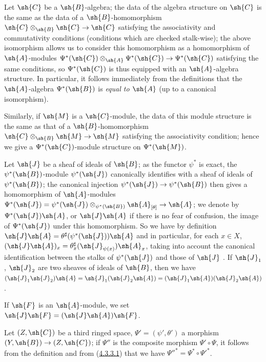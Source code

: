 \begin{env}[4.3.4]
\label{0.4.3.4}
Let $\sh{C}$ be a $\sh{B}$-algebra; the data of the algebra structure on
$\sh{C}$ is the same as the data of a $\sh{B}$-homomorphism
$\sh{C}\otimes_\sh{B}\sh{C}\to\sh{C}$ satisfying the associativity and
commutativity conditions (conditions which are checked stalk-wise); the above
isomorphism allows us to consider this homomorphism as a homomorphism of
$\sh{A}$-modules $\Psi^*(\sh{C})\otimes_\sh{A}\Psi^*(\sh{C})\to\Psi^*(\sh{C})$
satisfying the same conditions, so $\Psi^*(\sh{C})$ is thus equipped with an
$\sh{A}$-algebra structure. In particular, it follows immediately from the
definitions that the $\sh{A}$-algebra $\Psi^*(\sh{B})$ is \emph{equal to
$\sh{A}$} (up to a canonical isomorphism).

Similarly, if $\sh{M}$ is a $\sh{C}$-module, the data of this module structure
is the same
as that of a $\sh{B}$-homomorphism $\sh{C}\otimes_\sh{B}\sh{M}\to\sh{M}$
satisfying the associativity condition; hence we give a $\Psi^*(\sh{C})$-module
structure on $\Psi^*(\sh{M})$.
\end{env}

\begin{env}[4.3.5]
\label{0.4.3.5}
Let $\sh{J}$ be a sheaf of ideals of $\sh{B}$; as the functor $\psi^*$ is exact,
the $\psi^*(\sh{B})$-module $\psi^*(\sh{J})$ canonically identifies with a sheaf
of ideals of $\psi^*(\sh{B})$; the canonical injection
$\psi^*(\sh{J})\to\psi^*(\sh{B})$ then gives a homomorphism of $\sh{A}$-modules
$\Psi^*(\sh{J})=\psi^*(\sh{J})\otimes_{\psi^*(\sh{B})}\sh{A}_{[\theta]}
  \to\sh{A}$; we denote by $\Psi^*(\sh{J})\sh{A}$, or $\sh{J}\sh{A}$ if there is
no fear of confusion, the image of $\Psi^*(\sh{J})$ under this homomorphism. So
we have by definition $\sh{J}\sh{A}=\theta^\sharp(\psi^*(\sh{J}))\sh{A}$ and in
particular, for each $x\in X$,
$(\sh{J}\sh{A})_x=\theta_x^\sharp(\sh{J}_{\psi(x)})\sh{A}_x$, taking into
account the canonical identification between the stalks of $\psi^*(\sh{J})$ and
those of $\sh{J}$ . If $\sh{J}_1$, $\sh{J}_2$ are two sheaves
of ideals of $\sh{B}$, then we have
$(\sh{J}_1\sh{J}_2)\sh{A}
  =\sh{J}_1(\sh{J}_2\sh{A})=(\sh{J}_1\sh{A})(\sh{J}_2\sh{A})$.

If $\sh{F}$ is an $\sh{A}$-module, we set $\sh{J}\sh{F}=(\sh{J}\sh{A})\sh{F}$.
\end{env}

\begin{env}[4.3.6]
\label{0.4.3.6}
Let $(Z,\sh{C})$ be a third ringed space, $\Psi'=(\psi',\theta')$ a morphism
$(Y,\sh{B})\to(Z,\sh{C})$; if $\Psi''$ is the composite morphism
$\Psi'\circ\Psi$, it follows from the definition  and from
(\hyperref[0.4.3.3.1]{4.3.3.1}) that we have ${\Psi''}^*=\Psi^*\circ{\Psi'}^*$.
\end{env}

